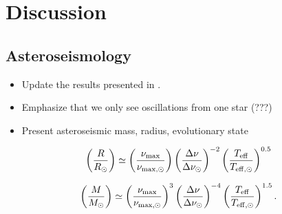 \section{Discussion}\label{discuss}

\subsection{Asteroseismology}\label{seismo}
\begin{itemize}
\item Update the results presented in \citet{gau14}.
\item Emphasize that we only see oscillations from one star (???)
\item Present asteroseismic mass, radius, evolutionary state
\end{itemize}

\begin{equation}
\left( \frac{R}{R_\odot} \right) \simeq \left( \frac{\nu_{\rm{max}}}{\nu_{\rm{max,\odot}}} \right) \left( \frac{\Delta \nu}{\Delta \nu_\odot} \right)^{-2} \left( \frac{T_{\rm{eff}}}{T_{\rm{eff,\odot}}} \right)^{0.5}
\end{equation}

\begin{equation}
\left( \frac{M}{M_\odot} \right) \simeq \left( \frac{\nu_{\rm{max}}}{\nu_{\rm{max,\odot}}} \right)^{3} \left( \frac{\Delta \nu}{\Delta \nu_\odot} \right)^{-4} \left( \frac{T_{\rm{eff}}}{T_{\rm{eff,\odot}}} \right)^{1.5}.
\end{equation}